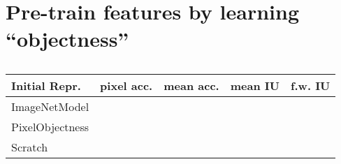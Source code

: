 \section{Pre-train features by learning ``objectness''}
\label{sec:objectness}

\begin{table}
\begin{center}
\begin{tabular}{l|llll}
Initial Repr.  & pixel acc. & mean acc. & mean IU & f.w. IU \\
\hline
ImageNetModel         &  &  & & \\
PixelObjectness  & & & & \\
Scratch          & & & & \\
\end{tabular}
\end{center}
\caption{}
\end{table}
